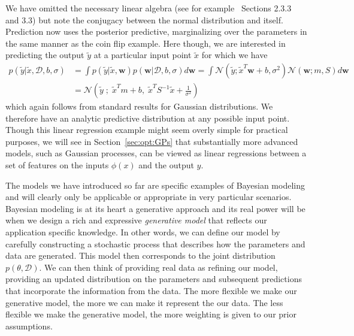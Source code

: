 We have omitted the necessary linear algebra (see for example~\cite{bishop2006pattern}
Sections 2.3.3 and 3.3)
but note the conjugacy between
the normal distribution and itself.  Prediction now uses the posterior predictive, marginalizing
over the parameters in the same manner as the coin flip example.  Here though, we are interested
in predicting the output $\tilde{y}$ at a particular input point $\tilde{x}$ for which we have
\begin{align}
p(\tilde{y}| \tilde{x},\mathcal{D}, b,\sigma) &= \int p(\tilde{y}| \tilde{x},\mathbf{w}) 
p(\mathbf{w}| \mathcal{D}, b,\sigma) d\mathbf{w} 
= \int \mathcal{N}(\tilde{y};\tilde{x}^T\mathbf{w}+b,\sigma^2)
\mathcal{N}\left(\mathbf{w} ; m, S\right) d\mathbf{w} \nonumber \\
&= \mathcal{N} \left(\tilde{y} \; ; \;\tilde{x}^Tm+b, \; \tilde{x}^T S^{-1}\tilde{x}+\frac{1}{\sigma^2} \right)
\end{align}
which again follows from standard results for Gaussian distributions.  We therefore have
an analytic predictive distribution at any possible input point.
Though this linear regression example might seem overly simple for practical purposes, we
will see in Section~\ref{sec:opt:GPs} that substantially more advanced models, such as
Gaussian processes, can be viewed as linear regressions between a set of features on the inputs $\phi(x)$
and the output $y$.

The models we have introduced so far are specific examples of Bayesian modeling and will
clearly only be applicable or appropriate in very particular scenarios.  
Bayesian modeling is at its heart a
generative approach and its real power will be when we design a rich and expressive \emph{generative model} 
that reflects our application specific knowledge.  In other words, we can define our model
by carefully constructing a stochastic process that describes how the parameters  and data are generated.
This model then corresponds to the joint distribution $p(\theta,\mathcal{D})$.
We can then think of providing real data as refining our model, providing an updated distribution
on the parameters and subsequent predictions that incorporate the information from the data.  The more
flexible we make our generative model, the more we can make it represent the our data.  The less flexible
we make the generative model, the more weighting is given to our prior assumptions.

